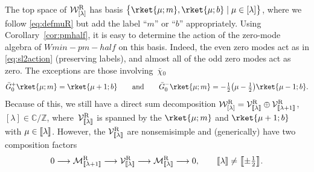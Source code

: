 \documentclass[10pt,a4paper]{amsart}
\numberwithin{equation}{section}
\newcommand{\bchi}{\bar{\chi}{}} %
\newcommand{\bG}{\bar{G}{}}
\newcommand{\kk}{\mathsf{k}} %
\newcommand{\R}{\textnormal{R}}
\DeclarePairedDelimiter{\dbrac}{\llbracket}{\rrbracket} %
\newcommand{\lra}{\longrightarrow}
\newcommand{\ses}[3]{0 \lra #1 \lra #2 \lra #3 \lra 0}
\newcommand{\fld}[1]{\mathbb{#1}} %
\newcommand{\VOA}[1]{\mathsf{#1}} %
\newcommand{\Mod}[1]{\mathcal{#1}} %
\newcommand{\ZZ}{\fld{Z}}
\newcommand{\CC}{\fld{C}}
\newcommand{\swalg}[2]{\VOA{W}_{#1}^{\mathrm{#2}}} %
\newcommand{\smin}[1][\kk]{\swalg{#1}{min}} %
\newcommand{\sminpmhalf}{\smin[\pm 1/2]}
\newcommand{\nrrel}[1]{\Mod{M}^{\R}_{\vphantom{[#1]}\smash{\dbrac{#1}}}}
\newcommand{\nrverma}[1]{\Mod{W}^{\R}_{[#1]}}
\newcommand{\nrver}[1]{\Mod{V}^{\R}_{\vphantom{[#1]}\smash{\dbrac{#1}}}}
\def\smash#1{#1}
\def\sminpmhalf{Wmin-pm-half}
\begin{document}
The top space of $\nrverma{\lambda}$ has basis $\bigl\{\rket{\mu;m}, \rket{\mu;b} \mid \mu \in [\lambda]\bigr\}$, where we follow \eqref{eq:defmuR} but add the label ``$m$'' or ``$b$'' appropriately.
Using Corollary~\ref{cor:pmhalf}, it is easy to determine the action of the zero-mode algebra of \smash{$\sminpmhalf$} on this basis.
Indeed, the even zero modes act as in \eqref{eq:sl2action} (preserving labels), and almost all of the odd zero modes act as zero.
The exceptions are those involving~$\bchi_0$
\[ %
	\bG^+_0 \rket{\mu;m} = \rket{\mu+1;b} \qquad \text{and} \qquad
	\bG^-_0 \rket{\mu;m} = -\tfrac{1}{2}\bigl(\mu-\tfrac{1}{2}\bigr) \rket{\mu-1;b}.
\]
Because of this, we still have a direct sum decomposition
\smash{$\nrverma{\lambda} = \nrver{\lambda} \oplus \nrver{\lambda+1}$}, \smash{$ [\lambda] \in \CC/\ZZ$},
where~\smash{$\nrver{\lambda}$} is spanned by the $\rket{\mu;m}$ and $\rket{\mu+1;b}$ with $\mu \in \dbrac{\lambda}$.
However, the \smash{$\nrver{\lambda}$} are nonsemisimple and (generically) have two composition factors
\begin{equation} \label{eq:sesV}
	\ses{\nrrel{\lambda+1}}{\nrver{\lambda}}{\nrrel{\lambda}}, \qquad \dbrac{\lambda} \ne \dbrac[\big]{\pm\tfrac{1}{2}}.
\end{equation}
\end{document}
